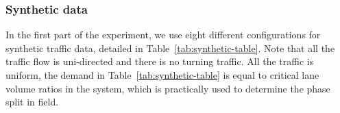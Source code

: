 \subsubsection{Synthetic data}

In the first part of the experiment, we use eight different configurations for synthetic traffic data, detailed in Table~\ref{tab:synthetic-table}. Note that all the traffic flow is uni-directed and there is no turning traffic. All the traffic is uniform, the demand in Table~\ref{tab:synthetic-table} is equal to critical lane volume ratios in the system, which is practically used to determine the phase split in field.


